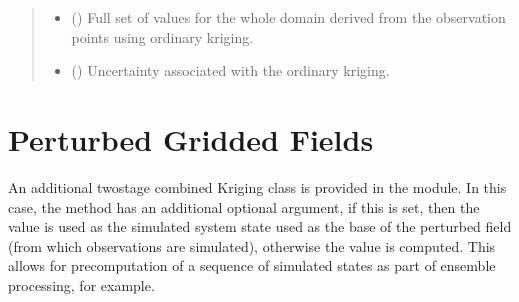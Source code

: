 \documentclass[letterpaper,10pt,english]{sphinxmanual}
\begin{document}
\begin{fulllineitems}
\begin{quote}
\begin{description}
\begin{itemize}
\end{itemize}

\sphinxAtStartPar
{}

\sphinxAtStartPar
\begin{itemize}
\item {}
\sphinxAtStartPar
{} () \textendash{} Full set of values for the whole domain derived from the observation
points using ordinary kriging.

\item {}
\sphinxAtStartPar
{} () \textendash{} Uncertainty associated with the ordinary kriging.

\end{itemize}


\end{description}\end{quote}

\end{fulllineitems}



\section{Perturbed Gridded Fields}
\label{\detokenize{kriging:perturbed-gridded-fields}}
\sphinxAtStartPar
An additional two\sphinxhyphen{}stage combined Kriging class is provided in the  module. In this case,
the  method has an additional optional  argument, if this is set, then the
value is used as the simulated system state used as the base of the perturbed field (from which
observations are simulated), otherwise the value is computed. This allows for pre\sphinxhyphen{}computation of a
sequence of simulated states as part of ensemble processing, for example.
\end{document}
